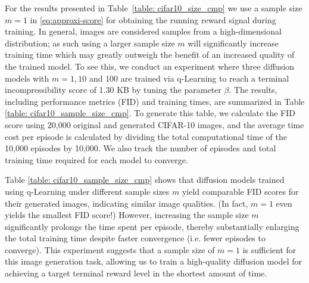 \documentclass[11pt]{article}
\begin{document}
For the results presented in Table~\ref{table: cifar10_size_cmp} we use a sample size $m=1$ in \eqref{eq:approxi-score} for obtaining the running reward signal during training. In general, images are considered samples from a high-dimensional distribution; as such
using a larger sample size $m$ will significantly increase training time which may greatly outweigh the benefit of an increased quality of the trained model.
To see this, we conduct an experiment where three diffusion models with $m=1, 10$ and $100$ are trained via q-Learning to reach a terminal incompressibility score of 1.30 KB by tuning the parameter $\beta$. The results, including performance metrics (FID) and training times, are summarized in Table \ref{table: cifar10_sample_size_cmp}. To generate this table, we calculate the FID score using 20,000 original and generated CIFAR-10 images, and the average time cost per episode is calculated by dividing the total computational time of the 10,000 episodes by 10,000. We also track the number of episodes and total training time required for each model to converge.



 Table \ref{table: cifar10_sample_size_cmp} shows that diffusion models trained using q-Learning under different sample sizes $m$ yield comparable FID scores for their generated images, indicating similar image qualities. (In fact, $m=1$ even yields the smallest FID score!) However, increasing the sample size $m$ significantly prolongs the time spent per episode, thereby substantially enlarging the total training time despite faster convergence (i.e. fewer episodes to converge). This experiment suggests that a sample size of $m=1$ is sufficient for this image generation task, allowing us to train a high-quality diffusion model for achieving a target terminal reward level in the shortest amount of time.
\end{document}
